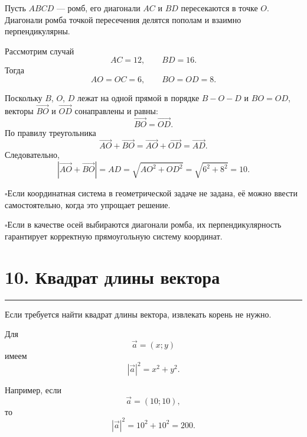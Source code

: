 \documentclass[a4paper,12pt]{article}
\newcommand{\vect}[1]{\overrightarrow{#1}}
\newcommand{\vct}[1]{\vec{#1}}
\newcommand{\modv}[1]{\left|#1\right|}
\newcommand{\sectionline}{%
    \vspace{0.1em}
    {\color{accent}\rule{\linewidth}{0.6pt}}
    \vspace{0.3em}
}
\newcommand{\topic}[1]{%
    \Needspace{7\baselineskip}%
    \section*{\color{darkaccent}#1}
    \sectionline
}
\newcommand{\checkitem}[1]{%
    \par\noindent
    {\color{accent}\(\square\)}\;#1\par
}
\begin{document}
\begin{minipage}[t]{0.59\linewidth}
Пусть \(ABCD\) --- ромб, его диагонали \(AC\) и \(BD\) пересекаются в точке \(O\). Диагонали ромба точкой пересечения делятся пополам и взаимно перпендикулярны.

Рассмотрим случай
\[
AC=12,
\qquad
BD=16.
\]
Тогда
\[
AO=OC=6,
\qquad
BO=OD=8.
\]
\end{minipage}
\hfill
\begin{minipage}[t]{0.36\linewidth}
\centering
\vspace{0pt}
\end{minipage}

Поскольку \(B\), \(O\), \(D\) лежат на одной прямой в порядке \(B\! - \!O\! - \!D\) и \(BO=OD\), векторы \(\vect{BO}\) и \(\vect{OD}\) сонаправлены и равны:
\[
\vect{BO}=\vect{OD}.
\]
По правилу треугольника
\[
\vect{AO}+\vect{BO}
=
\vect{AO}+\vect{OD}
=
\vect{AD}.
\]
Следовательно,
\[
\modv{\vect{AO}+\vect{BO}}
=AD
=\sqrt{AO^2+OD^2}
=\sqrt{6^2+8^2}
=10.
\]

\checkitem{Если координатная система в геометрической задаче не задана, её можно ввести самостоятельно, когда это упрощает решение.}

\checkitem{Если в качестве осей выбираются диагонали ромба, их перпендикулярность гарантирует корректную прямоугольную систему координат.}

\topic{10. Квадрат длины вектора}

Если требуется найти квадрат длины вектора, извлекать корень не нужно.

Для
\[
\vct a=(x;y)
\]
имеем
\[
\boxed{
\modv{\vct a}^{2}=x^2+y^2
}.
\]

Например, если
\[
\vct a=(10;10),
\]
то
\[
\modv{\vct a}^{2}
=
10^2+10^2
=
200.
\]
\end{document}

